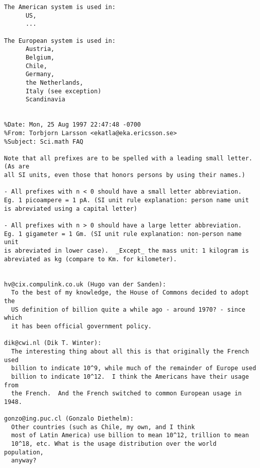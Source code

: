 \begin{verbatim}
The American system is used in:
      US,
      ...

The European system is used in:
      Austria,
      Belgium,
      Chile,
      Germany,
      the Netherlands,
      Italy (see exception)
      Scandinavia


%Date: Mon, 25 Aug 1997 22:47:48 -0700
%From: Torbjorn Larsson <ekatla@eka.ericsson.se>
%Subject: Sci.math FAQ

Note that all prefixes are to be spelled with a leading small letter. (As are
all SI units, even those that honors persons by using their names.)

- All prefixes with n < 0 should have a small letter abbreviation.
Eg. 1 picoampere = 1 pA. (SI unit rule explanation: person name unit
is abreviated using a capital letter)

- All prefixes with n > 0 should have a large letter abbreviation.
Eg. 1 gigameter = 1 Gm. (SI unit rule explanation: non-person name unit
is abreviated in lower case).  _Except_ the mass unit: 1 kilogram is
abreviated as kg (compare to Km. for kilometer).


hv@cix.compulink.co.uk (Hugo van der Sanden):
  To the best of my knowledge, the House of Commons decided to adopt the
  US definition of billion quite a while ago - around 1970? - since which
  it has been official government policy.

dik@cwi.nl (Dik T. Winter):
  The interesting thing about all this is that originally the French used
  billion to indicate 10^9, while much of the remainder of Europe used
  billion to indicate 10^12.  I think the Americans have their usage from
  the French.  And the French switched to common European usage in 1948.

gonzo@ing.puc.cl (Gonzalo Diethelm):
  Other countries (such as Chile, my own, and I think
  most of Latin America) use billion to mean 10^12, trillion to mean
  10^18, etc. What is the usage distribution over the world population,
  anyway?

\end{verbatim}
